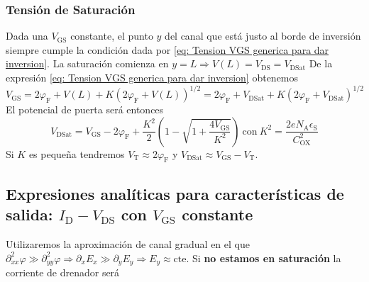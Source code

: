 \subsubsection{Tensión de Saturación}
Dada una $V_\mathrm{GS}$ constante, el punto $y$ del canal que está justo al borde de inversión siempre cumple la condición dada por \ref{eq: Tension VGS generica para dar inversion}. La saturación comienza en $y=L \Rightarrow V(L)=V_\mathrm{DS}=V_\mathrm{DSat}$ De la expresión \ref{eq: Tension VGS generica para dar inversion} obtenemos
\begin{equation}
V_\mathrm{GS}=2\varphi_\mathrm{F}+V(L)+K(2\varphi_\mathrm{F}+V(L))^{1/2}=2\varphi_\mathrm{F}+V_\mathrm{DSat}+K(2\varphi_\mathrm{F}+V_\mathrm{DSat})^{1/2}
\label{eq: Tension de puerta al comienzo de saturacion}
\end{equation}
El potencial de puerta será entonces
\begin{equation}
    V_\mathrm{DSat}=V_\mathrm{GS}-2\varphi_\mathrm{F}+\frac{K^2}{2}\left(1-\sqrt{1+\frac{4V_\mathrm{GS}}{K^2}}\right) \ \text{con} \ K^2=\frac{2eN_\mathrm{A}\epsilon_\mathrm{S}}{C^2_\mathrm{OX}}
    \label{eq: Tension de saturacion}
\end{equation}
Si $K$ es pequeña tendremos $V_\mathrm{T}\approx 2\varphi_\mathrm{F}$ y $V_\mathrm{DSat}\approx V_\mathrm{GS}-V_\mathrm{T}$.
\subsection{Expresiones analíticas para características de salida: $I_\mathrm{D}-V_\mathrm{DS}$ con $V_\mathrm{GS}$ constante}
Utilizaremos la aproximación de canal gradual en el que $\partial^2_{xx} \varphi \gg \partial^2_{yy} \varphi \Rightarrow \partial_xE_x \gg \partial_yE_y \Rightarrow E_y\approx \text{cte}$. Si \textbf{no estamos en saturación} la corriente de drenador será

